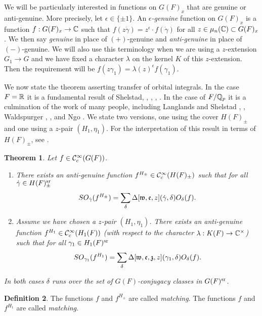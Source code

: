 \documentclass{article}
\newtheorem{thm}{Theorem}[subsection]
\theoremstyle{definition}
\newtheorem{dfn}[thm]{Definition}
\numberwithin{equation}{section}
\renewcommand{\-}{\hyp{}}
\begin{document}
We will be particularly interested in functions on $G(F)_x$ that are genuine or anti-genuine. More precisely, let $\epsilon \in \{\pm1\}$. An \emph{$\epsilon$-genuine} function on $G(F)_x$ is a function $f : G(F)_x \to \mathbb{C}$ such that $f(z\dot\gamma)=z^\epsilon \cdot f(\dot\gamma)$ for all $z \in \mu_n(\mathbb{C}) \subset G(F)_x$. We then say \emph{genuine} in place of $(+)$-genuine and \emph{anti-genuine} in place of $(-)$-genuine. We will also use this terminology when we are using a $z$-extension $G_1 \to G$ and we have fixed a character $\lambda$ on the kernel $K$ of this $z$-extension. Then the requirement will be $f(z\gamma_1)=\lambda(z)^\epsilon f(\gamma_1)$.

We now state the theorem asserting transfer of orbital integrals. In the case $F=\mathbb{R}$ it is a fundamental result of Shelstad, \cite[\S3]{She82}, \cite[Theorem 5.2.1]{She83}, \cite[\S2.6]{LS90}, \cite[Theorem 14.3]{SheTE1}. In the case of $F/\mathbb{Q}_p$ it is a culmination of the work of many people, including Langlands and Shelstad \cite{LS87}, \cite{LS90}, Waldspurger \cite{Wal97}, \cite{Wal06ECC}, and Ngo \cite{Ngo10}. We state two versions, one using the cover $H(F)_\pm$ and one using a $z$-pair $(H_1,\eta_1)$. For the interpretation of this result in terms of $H(F)_\pm$, see \cite[Theorem 5.6.2]{KalHDC}.

\begin{thm} \label{thm:orbtrans}
Let $f \in \mathcal{C}_c^\infty(G(F))$.
\begin{enumerate}
	\item There exists an anti-genuine function $f^{H_\pm} \in \mathcal{C}_c^\infty(H(F)_\pm)$ such that for all $\dot\gamma \in H(F)_\pm^{\textrm{sr}}$
	\[ SO_{\dot\gamma}(f^{H_\pm}) = \sum_\delta \Delta[\mathfrak{w},\mathfrak{e},z](\dot\gamma,\delta) O_\delta(f). \]
	\item Assume we have chosen a $z$-pair $(H_1,\eta_1)$. There exists an anti-genuine function $f^{H_1} \in \mathcal{C}_c^\infty(H_1(F))$ (with respect to the character $\lambda : K(F) \to \mathbb{C}^\times$) such that for all $\gamma_1 \in H_1(F)^{\textrm{sr}}$
	\[ SO_{\gamma_1}(f^{H_1}) = \sum_\delta \Delta[\mathfrak{w},\mathfrak{e},\mathfrak{z},z](\gamma_1,\delta) O_\delta(f). \]
\end{enumerate}


In both cases $\delta$ runs over the set of $G(F)$-conjugacy classes in $G(F)^{\textrm{sr}}$.
\end{thm}

\begin{dfn} \label{dfn:matching}
The functions $f$ and $f^{H_\pm}$ are called \emph{matching}. The functions $f$ and $f^{H_1}$ are called \emph{matching}.
\end{dfn}
\end{document}
